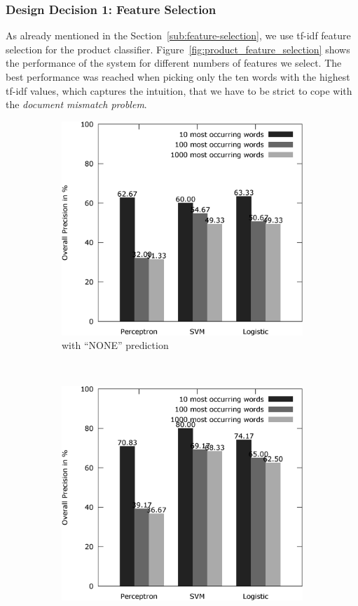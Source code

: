 \subsubsection{Design Decision 1: Feature Selection}
As already mentioned in the Section~\ref{sub:feature-selection}, we use tf-idf feature selection for the product classifier.
Figure~\ref{fig:product_feature_selection} shows the performance of the system for different numbers of features we select.
The best performance was reached when picking only the ten words with the highest tf-idf values, which captures the intuition, that we have to be strict to cope with the \emph{document mismatch problem}.
\begin{figure}[h!]
	\centering
	\begin{subfigure}[t]{0.5\textwidth}
		\includegraphics[width=\textwidth]{figures/product_feature_selection_with_none.eps}
		\caption{with ``NONE'' prediction}
	\end{subfigure}~
	\begin{subfigure}[t]{0.5\textwidth}
		\includegraphics[width=\textwidth]{figures/product_feature_selection_without_none.eps}

\end{subfigure}
\end{figure}

